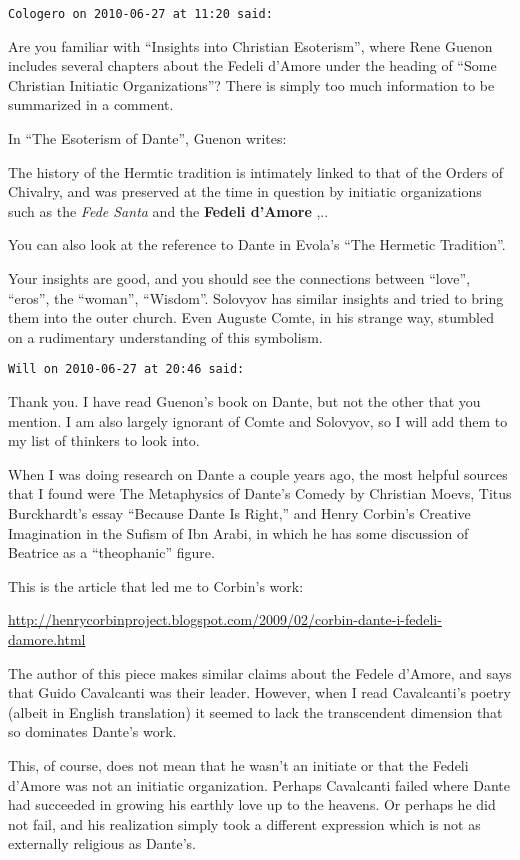 \begin{footnotesize}
\begin{sffamily}
\hfill

\texttt{Cologero on 2010-06-27 at 11:20 said: }

Are you familiar with “Insights into Christian Esoterism”, where Rene Guenon includes several chapters about the Fedeli d'Amore under the heading of “Some Christian Initiatic Organizations”? There is simply too much information to be summarized in a comment.

In “The Esoterism of Dante”, Guenon writes:

The history of the Hermtic tradition is intimately linked to that of the Orders of Chivalry, and was preserved at the time in question by initiatic organizations such as the \emph{Fede Santa} and the \textbf{Fedeli d'Amore} ,..

You can also look at the reference to Dante in Evola's “The Hermetic Tradition”.

Your insights are good, and you should see the connections between “love”, “eros”, the “woman”, “Wisdom”. Solovyov has similar insights and tried to bring them into the outer church. Even Auguste Comte, in his strange way, stumbled on a rudimentary understanding of this symbolism.


\hfill

\texttt{Will on 2010-06-27 at 20:46 said: }

Thank you. I have read Guenon's book on Dante, but not the other that you mention. I am also largely ignorant of Comte and Solovyov, so I will add them to my list of thinkers to look into.

When I was doing research on Dante a couple years ago, the most helpful sources that I found were The Metaphysics of Dante's Comedy by Christian Moevs, Titus Burckhardt's essay “Because Dante Is Right,” and Henry Corbin's Creative Imagination in the Sufism of Ibn Arabi, in which he has some discussion of Beatrice as a “theophanic” figure.

This is the article that led me to Corbin's work:

\url{http://henrycorbinproject.blogspot.com/2009/02/corbin-dante-i-fedeli-damore.html}

The author of this piece makes similar claims about the Fedele d'Amore, and says that Guido Cavalcanti was their leader. However, when I read Cavalcanti's poetry (albeit in English translation) it seemed to lack the transcendent dimension that so dominates Dante's work.

This, of course, does not mean that he wasn't an initiate or that the Fedeli d'Amore was not an initiatic organization. Perhaps Cavalcanti failed where Dante had succeeded in growing his earthly love up to the heavens. Or perhaps he did not fail, and his realization simply took a different expression which is not as externally religious as Dante's.


\end{sffamily}
\end{footnotesize}
